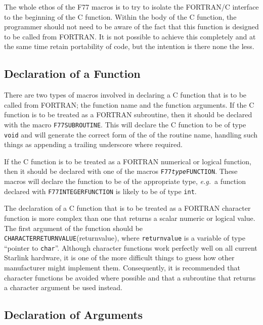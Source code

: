 \documentclass[twoside,11pt]{article}
\newcommand{\htmlref}[2]{#1}
\newcommand{\xlabel}[1]{}
\renewcommand{\_}{\texttt{\symbol{95}}}
\begin{document}
The whole ethos of the F77 macros is to try to isolate the FORTRAN/C
interface to the beginning of the C function. Within the body of the C
function, the programmer should not need to be aware of the fact that this
function is designed to be called from FORTRAN\@. It is not possible to achieve
this completely and at the same time retain portability of code, but the 
intention is there none the less.

\subsection{\xlabel{declaration_of_a_function}Declaration of a Function}

There are two types of macros involved in declaring a C function that is to be
called from FORTRAN; the function name and the function arguments. If the C
function is to be treated as a FORTRAN subroutine, then it should be declared
with the macro 
\htmlref{\texttt{F77\_SUBROUTINE}}{F77_SUBROUTINE}. 
This will declare the C function to be of type \texttt{void} and will generate 
the correct form of the of the routine name, handling such things as appending 
a trailing underscore where required.

If the C function is to be treated as a FORTRAN numerical or logical function, 
then it should be declared with one of the macros 
\htmlref{\texttt{F77\_\textit{type}\_FUNCTION}}{F77_type_FUNCTION}.
These macros will declare the function to be of the appropriate type, 
\textit{e.g.}\ a function declared with 
\texttt{F77\_\-INTEGER\_\-FUNCTION} is 
likely to be of type \texttt{int}.

The declaration of a C function that is to be treated as a FORTRAN character
function is more complex than one that returns a scalar numeric or logical
value. The first argument of the function should be 
\htmlref{\texttt{CHARACTER\_\-RETURN\_\-VALUE}}
{CHARACTER_RETURN_VALUE}(return\_value), 
where
\texttt{return\_value} is a variable of type ``pointer to \texttt{char}''. 
Although character functions work
perfectly well on all current Starlink hardware, it is one of the more
difficult things to guess how other manufacturer might implement them.
Consequently, it is recommended that character functions be avoided where
possible and that a subroutine that returns a character argument be used
instead.

\subsection{\xlabel{declaration_of_arguments}Declaration of Arguments}
\end{document}
